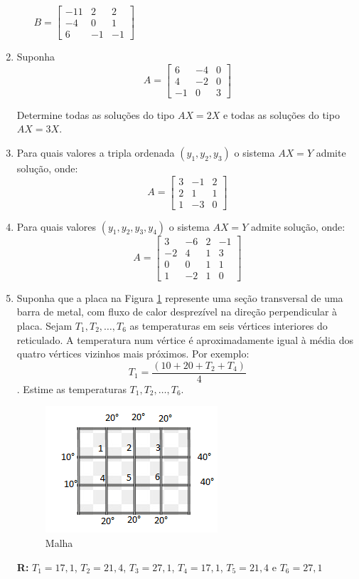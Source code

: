 \documentclass[oneside,a4paper,12pt]{article}
\begin{document}
\begin{enumerate}
\begin{multicols}{2}
\begin{enumerate}
		$B=\left[
		\begin{array}{ccc}
		-11	&	2	&	2	\\
		-4	&	0	&	1	\\
		6	&	-1	&	-1
		\end{array}
		\right]
		$
	\end{enumerate}
	\end{multicols}

	\item Suponha 
	$$A=\left[
	\begin{array}{ccc}
	6	&	-4	&	0	\\
	4	&	-2	&	0	\\
	-1	&	0	&	3
	\end{array}
	\right]
	$$
	
	Determine todas as soluções do tipo $AX = 2X$ e todas as soluções do tipo $AX = 3X$.
	
	\item Para quais valores a tripla ordenada $(y_1,y_2,y_3)$ o sistema $AX=Y$ admite solução, onde:
	$$A=\left[
	\begin{array}{ccc}
	3	&	-1	&	2	\\
	2	&	1	&	1	\\
	1	&	-3	&	0
	\end{array}
	\right]
	$$
	
	\item Para quais valores $(y_1,y_2,y_3,y_4)$ o sistema $AX=Y$ admite solução, onde:
	$$A=\left[
	\begin{array}{cccc}
	3	&	-6	&	2	&	-1	\\
	-2	&	4	&	1	&	3	\\
	0	&	0	&	1	&	1	\\
	1	&	-2	&	1	&	0
	
	\end{array}
	\right]
	$$

	\item Suponha que a placa na Figura \ref{ex01}  represente uma seção transversal de uma barra de metal, com fluxo de calor desprezível na direção perpendicular à placa.
	Sejam $T_1,T_2,\dots,T_6$ as temperaturas em seis vértices interiores do reticulado. A temperatura num vértice é aproximadamente igual à média dos quatro vértices vizinhos  mais próximos. Por exemplo:
	$$T_1 = \frac{(10 + 20 + T_2 + T_4)}{4}$$.
	Estime as temperaturas $T_1,T_2,\dots,T_6$.
	
	\begin{figure}[!h]
		\centering
		\includegraphics[width=0.4\linewidth]{Figuras/ex01}
		\caption{Malha}
		\label{ex01}
	\end{figure}
	
	{\bf R:} $T_1 = 17,1$, $T_2 = 21,4$, $T_3 = 27,1$, $T_4 = 17,1$, $T_5 = 21,4$ e $T_6 = 27,1$
	
	
\end{enumerate}

	
\end{document}
